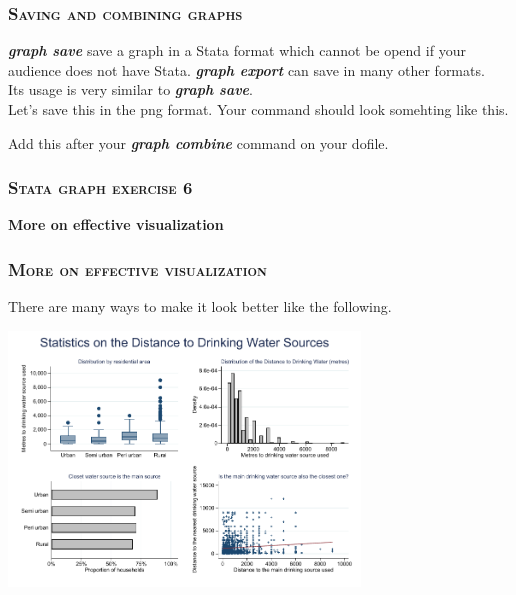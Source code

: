 \documentclass[10pt]{beamer}
\begin{document}
	\begin{frame}
	\frametitle{\textsc{Saving and combining graphs}}
		 \textbf{\textit{graph save}} save a graph in a Stata format
					 which cannot be opend if your audience does not have Stata.
		\vspace{2mm}
		\onslide<2-> \textbf{\textit{graph export}} can save in many other formats. \\
		\vspace{2mm}
					 Its usage is very similar to \textbf{\textit{graph save}}. \\
		\vspace{2mm}
					 Let's save this in the png format.
		\onslide<3-> Your command should look somehting like this. 
					 
	
\begin{stlog}\end{stlog}
		Add this after your \textbf{\textit{graph combine}} command on your dofile.
	\end{frame}

	\begin{frame}
	\frametitle{\textsc{Stata graph exercise 6}}
		\begin{center}
		\Large \textbf{More on effective visualization}
		\end{center}
	\end{frame}	
	
	\begin{frame}
	\frametitle{\textsc{More on effective visualization}}
		There are many ways to make it look better like the following. \\
		\vspace{1mm}
	
\begin{center}
    \includegraphics[width=0.7\textwidth]{combined_better.pdf}
\end{center}
	\end{frame}
\end{document}

